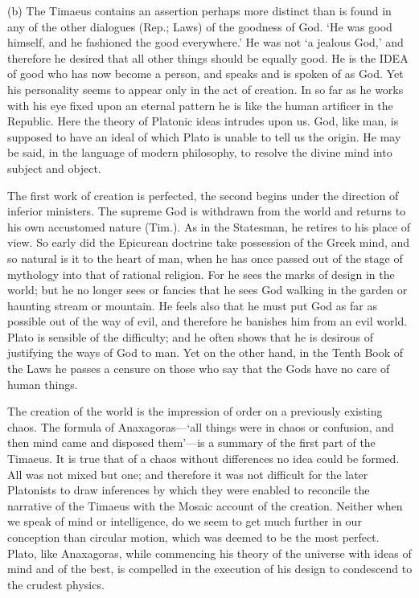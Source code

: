 \documentclass[11pt,letter]{article}
\begin{document}
\par  (b) The Timaeus contains an assertion perhaps more distinct than is found in any of the other dialogues (Rep.; Laws) of the goodness of God. ‘He was good himself, and he fashioned the good everywhere.’ He was not ‘a jealous God,’ and therefore he desired that all other things should be equally good. He is the IDEA of good who has now become a person, and speaks and is spoken of as God. Yet his personality seems to appear only in the act of creation. In so far as he works with his eye fixed upon an eternal pattern he is like the human artificer in the Republic. Here the theory of Platonic ideas intrudes upon us. God, like man, is supposed to have an ideal of which Plato is unable to tell us the origin. He may be said, in the language of modern philosophy, to resolve the divine mind into subject and object.

\par  The first work of creation is perfected, the second begins under the direction of inferior ministers. The supreme God is withdrawn from the world and returns to his own accustomed nature (Tim.). As in the Statesman, he retires to his place of view. So early did the Epicurean doctrine take possession of the Greek mind, and so natural is it to the heart of man, when he has once passed out of the stage of mythology into that of rational religion. For he sees the marks of design in the world; but he no longer sees or fancies that he sees God walking in the garden or haunting stream or mountain. He feels also that he must put God as far as possible out of the way of evil, and therefore he banishes him from an evil world. Plato is sensible of the difficulty; and he often shows that he is desirous of justifying the ways of God to man. Yet on the other hand, in the Tenth Book of the Laws he passes a censure on those who say that the Gods have no care of human things.

\par  The creation of the world is the impression of order on a previously existing chaos. The formula of Anaxagoras—‘all things were in chaos or confusion, and then mind came and disposed them’—is a summary of the first part of the Timaeus. It is true that of a chaos without differences no idea could be formed. All was not mixed but one; and therefore it was not difficult for the later Platonists to draw inferences by which they were enabled to reconcile the narrative of the Timaeus with the Mosaic account of the creation. Neither when we speak of mind or intelligence, do we seem to get much further in our conception than circular motion, which was deemed to be the most perfect. Plato, like Anaxagoras, while commencing his theory of the universe with ideas of mind and of the best, is compelled in the execution of his design to condescend to the crudest physics.
\end{document}
